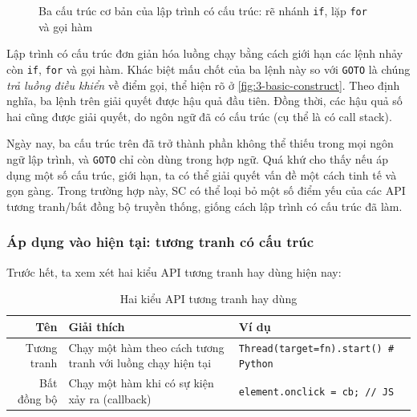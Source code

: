 \documentclass[../../thesis]{subfiles}
\begin{document}
\begin{figure}
    \centering
    \vspace*{-6mm}
    
    \vspace*{-10mm}
    \caption{Ba cấu trúc cơ bản của lập trình có cấu trúc: rẽ nhánh \texttt{if},
        lặp \texttt{for} và gọi hàm \cite{NJS_SC}}
    \label{fig:3-basic-construct}
\end{figure}

Lập trình có cấu trúc đơn giản hóa luồng chạy bằng cách giới hạn các lệnh nhảy
còn \texttt{if}, \texttt{for} và gọi hàm. Khác biệt mấu chốt của ba lệnh này so
với \texttt{GOTO} là chúng \emph{trả luồng điều khiển} về điểm gọi, thể hiện rõ
ở \autoref{fig:3-basic-construct}. Theo định nghĩa, ba lệnh trên giải quyết được
hậu quả đầu tiên. Đồng thời, các hậu quả số hai cũng được giải quyết, do ngôn
ngữ đã có cấu trúc (cụ thể là có call stack).

Ngày nay, ba cấu trúc trên đã trở thành phần không thể thiếu trong mọi ngôn ngữ
lập trình, và \texttt{GOTO} chỉ còn dùng trong hợp ngữ. Quá khứ cho thấy nếu áp
dụng một số cấu trúc, giới hạn, ta có thể giải quyết vấn đề một cách tinh tế và
gọn gàng. Trong trường hợp này, SC có thể loại bỏ một số điểm yếu của các API
tương tranh/bất đồng bộ truyền thống, giống cách lập trình có cấu trúc đã làm.

\subsubsection{Áp dụng vào hiện tại: tương tranh có cấu trúc}

Trước hết, ta xem xét hai kiểu API tương tranh hay dùng hiện nay:


\begin{table}[H]
    \centering
    \caption{Hai kiểu API tương tranh hay dùng \cite{NJS_SC}}
    \label{table:2-async-apis}
    \begin{tabular}{r p{4.7cm} l}
        \toprule
        Tên         & Giải thích                                                 & Ví dụ \\
        \midrule
        Tương tranh & Chạy một hàm theo cách tương tranh với luồng chạy hiện tại & \texttt{Thread(target=fn).start() \# Python} \\
        Bất đồng bộ & Chạy một hàm khi có sự kiện xảy ra (callback)              & \texttt{element.onclick = cb; // JS} \\
        \bottomrule
    \end{tabular}
\end{table}
\end{document}
